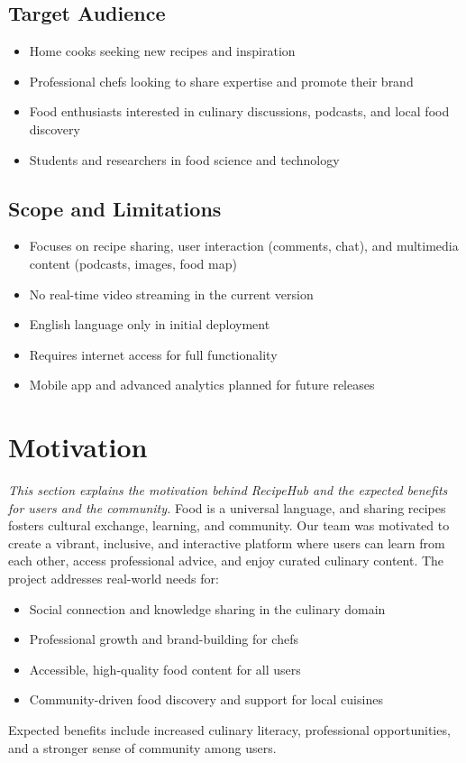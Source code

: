 \documentclass[conference]{IEEEtran}
\begin{document}
\subsection{Target Audience}
\begin{itemize}
    \item Home cooks seeking new recipes and inspiration
    \item Professional chefs looking to share expertise and promote their brand
    \item Food enthusiasts interested in culinary discussions, podcasts, and local food discovery
    \item Students and researchers in food science and technology
\end{itemize}

\subsection{Scope and Limitations}
\begin{itemize}
    \item Focuses on recipe sharing, user interaction (comments, chat), and multimedia content (podcasts, images, food map)
    \item No real-time video streaming in the current version
    \item English language only in initial deployment
    \item Requires internet access for full functionality
    \item Mobile app and advanced analytics planned for future releases
\end{itemize}

\section{Motivation}
\textit{This section explains the motivation behind RecipeHub and the expected benefits for users and the community.}
Food is a universal language, and sharing recipes fosters cultural exchange, learning, and community. Our team was motivated to create a vibrant, inclusive, and interactive platform where users can learn from each other, access professional advice, and enjoy curated culinary content. The project addresses real-world needs for:
\begin{itemize}
    \item Social connection and knowledge sharing in the culinary domain
    \item Professional growth and brand-building for chefs
    \item Accessible, high-quality food content for all users
    \item Community-driven food discovery and support for local cuisines
\end{itemize}
Expected benefits include increased culinary literacy, professional opportunities, and a stronger sense of community among users.
\end{document}
